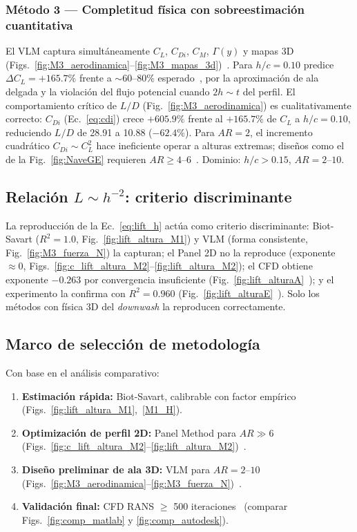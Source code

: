 \documentclass[twocolumn]{article}
\begin{document}
\subsubsection{Método 3 --- Completitud física con sobreestimación cuantitativa}

El VLM captura simultáneamente $C_L$, $C_{Di}$, $C_M$, $\Gamma(y)$ y mapas 3D (Figs.~\ref{fig:M3_aerodinamica}--\ref{fig:M3_mapas_3d})~\cite{katz2001}. Para $h/c = 0.10$ predice $\Delta C_L = +165.7\%$ frente a $\sim 60$--80\% esperado~\cite{zerihan2000}, por la aproximación de ala delgada y la violación del flujo potencial cuando $2h \sim t$ del perfil. El comportamiento crítico de $L/D$ (Fig.~\ref{fig:M3_aerodinamica}) es cualitativamente correcto: $C_{Di}$ (Ec.~\eqref{eq:cdi}) crece $+605.9\%$ frente al $+165.7\%$ de $C_L$ a $h/c = 0.10$, reduciendo $L/D$ de 28.91 a 10.88 ($-62.4\%$). Para $AR = 2$, el incremento cuadrático $C_{Di} \sim C_L^2$ hace ineficiente operar a alturas extremas; diseños como el de la Fig.~\ref{fig:NaveGE} requieren $AR \geq 4$--$6$~\cite{rozhdestvensky2006}. Dominio: $h/c > 0.15$, $AR = 2$--$10$.

\subsection{Relación $L \sim h^{-2}$: criterio discriminante}

La reproducción de la Ec.~\eqref{eq:lift_h} actúa como criterio discriminante: Biot-Savart ($R^2 = 1.0$, Fig.~\ref{fig:lift_altura_M1}) y VLM (forma consistente, Fig.~\ref{fig:M3_fuerza_N}) la capturan; el Panel 2D no la reproduce (exponente $\approx 0$, Figs.~\ref{fig:c_lift_altura_M2}--\ref{fig:lift_altura_M2}); el CFD obtiene exponente $-0.263$ por convergencia insuficiente (Fig.~\ref{fig:lift_alturaA}~\cite{autodesk2024}); y el experimento la confirma con $R^2 = 0.960$ (Fig.~\ref{fig:lift_alturaE}~\cite{hernandez2012}). Solo los métodos con física 3D del \textit{downwash} la reproducen correctamente.

\subsection{Marco de selección de metodología}

Con base en el análisis comparativo:
\begin{enumerate}
    \item \textbf{Estimación rápida:} Biot-Savart, calibrable con factor empírico (Figs.~\ref{fig:lift_altura_M1},~\ref{M1_H}).
    \item \textbf{Optimización de perfil 2D:} Panel Method para $AR \gg 6$ (Figs.~\ref{fig:c_lift_altura_M2}--\ref{fig:lift_altura_M2})~\cite{hess1967}.
    \item \textbf{Diseño preliminar de ala 3D:} VLM para $AR = 2$--$10$ (Figs.~\ref{fig:M3_aerodinamica}--\ref{fig:M3_fuerza_N})~\cite{katz2001}.
    \item \textbf{Validación final:} CFD RANS $\geq$ 500 iteraciones~\cite{versteeg2007} (comparar Figs.~\ref{fig:comp_matlab} y \ref{fig:comp_autodesk}).
\end{enumerate}
\end{document}
